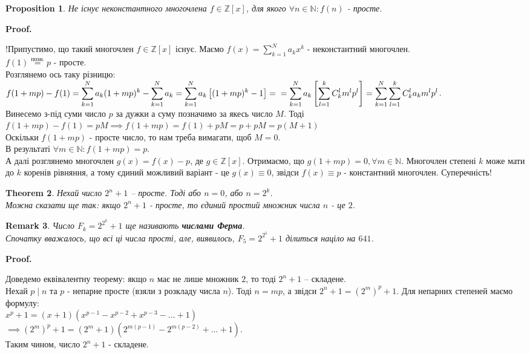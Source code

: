 \documentclass[a4paper, 14pt]{extarticle}
\makeatletter
\theoremstyle{theoremdd}
\newtheorem{theorem}{Theorem}[subsection]
\theoremstyle{theoremdd}
\theoremstyle{theoremdd}
\theoremstyle{theoremdd}
\theoremstyle{theoremdd}
\newtheorem{proposition}[theorem]{Proposition}
\theoremstyle{theoremdd}
\newtheorem{remark}[theorem]{Remark}
\theoremstyle{theoremdd}
\theoremstyle{theoremdd}
\def\qed{$\blacksquare$}
\renewenvironment{proof}[1][Proof.\\]{\par
\pushQED{\hfill \qed}%
\normalfont \topsep6\p@\@plus6\p@\relax
\trivlist
\item\relax
{\bfseries
#1\@addpunct{.}}\hspace\labelsep\ignorespaces
}{%
\popQED\endtrivlist\@endpefalse
}
\makeatother
\begin{document}
\begin{proposition}
Не існує неконстантного многочлена $f \in \mathbb{Z}[x]$, для якого $\forall n \in \mathbb{N}: f(n)$ - просте.
\end{proposition}

\begin{proof}
!Припустимо, що такий многочлен $f \in \mathbb{Z}[x]$ існує. Маємо $f(x) = \displaystyle\sum_{k=1}^N a_k x^k$ - неконстантний многочлен.\\
$f(1) \overset{\text{позн.}}{=} p$ - просте.\\
Розглянемо ось таку різницю:\\
$f(1+mp) - f(1) = \displaystyle\sum_{k=1}^N a_k (1+mp)^k - \sum_{k=1}^N a_k = \sum_{k=1}^N a_k \left[ (1+mp)^k-1 \right] = \\ = \sum_{k=1}^N a_k \left[ \sum_{l=1}^k C_k^l m^l p^l \right] = \sum_{k=1}^N \sum_{l=1}^k C_k^l a_k m^l p^l$.\\
Винесемо з-під суми число $p$ за дужки а суму позначимо за якесь число $M$. Тоді\\
$f(1+mp) - f(1) = pM \implies f(1+mp) = f(1) + pM = p + pM = p(M+1)$\\
Оскільки $f(1+mp)$ - просте число, то нам треба вимагати, щоб $M=0$.\\
В результаті $\forall m \in \mathbb{N}: f(1+mp) = p$.\\
А далі розглянемо многочлен $g(x) = f(x) - p$, де $g \in \mathbb{Z}[x]$. Отримаємо, що $g(1+mp) = 0, \forall m \in \mathbb{N}$. Многочлен степені $k$ може мати до $k$ коренів рівняння, а тому єдиний можливий варіант - це $g(x) \equiv 0$, звідси $f(x) \equiv p$ - константний многочлен. Суперечність!
\end{proof}

\begin{theorem}
Нехай число $2^n+1$ -- просте. Тоді або $n = 0$, або $n = 2^k$.\\
Можна сказати ще так: якщо $2^n+1$ - просте, то єдиний простий множник числа $n$ - це $2$.
\end{theorem}

\begin{remark}
Число $F_k = 2^{2^k} + 1$ ще називають \textbf{числами Ферма}.\\
Спочатку вважалось, що всі ці числа прості, але, виявилось, $F_5 = 2^{2^5} + 1$ ділиться націло на $641$.
\end{remark}

\begin{proof}
Доведемо еквівалентну теорему: якщо $n$ має не лише множник $2$, то тоді $2^n+1$ -- складене.\\
Нехай $p \mid n$ та $p$ - непарне просте (взяли з розкладу числа $n$). Тоді $n = mp$, а звідси $2^n+1 = (2^m)^p +1$. Для непарних степеней маємо формулу:\\
$x^p + 1 = (x+1)(x^{p-1} - x^{p-2} + x^{p-3} - \dots + 1)$\\
$\implies (2^m)^p + 1 = (2^m+1)(2^{m(p-1)} - 2^{m(p-2)} + \dots + 1)$.\\
Таким чином, число $2^n + 1$ - складене.
\end{proof}
\end{document}
